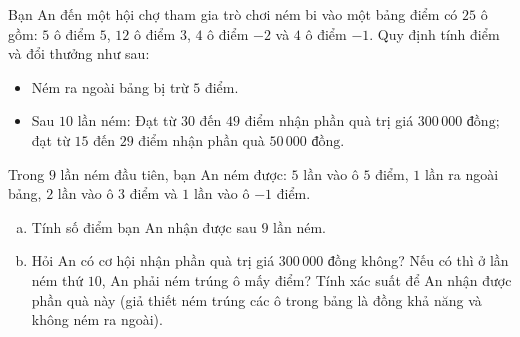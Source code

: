 \begin{bt}%
Bạn An đến một hội chợ tham gia trò chơi ném bi vào một bảng điểm có $25$ ô gồm: $5$ ô điểm $5$, $12$ ô điểm $3$, $4$ ô điểm $-2$ và $4$ ô điểm $-1$. Quy định tính điểm và đổi thưởng như sau:
\begin{itemize}
	\item Ném ra ngoài bảng bị trừ $5$ điểm.
	\item Sau $10$ lần ném: Đạt từ $30$ đến $49$ điểm nhận phần quà trị giá $300\,000\text{ đồng}$; đạt từ $15$ đến $29$ điểm nhận phần quà $50\,000\text{ đồng}$.
\end{itemize}
Trong $9$ lần ném đầu tiên, bạn An ném được: $5$ lần vào ô $5$ điểm, $1$ lần ra ngoài bảng, $2$ lần vào ô $3$ điểm và $1$ lần vào ô $-1$ điểm.
\begin{enumerate}[a)]
	\item Tính số điểm bạn An nhận được sau $9$ lần ném.
	\item Hỏi An có cơ hội nhận phần quà trị giá $300\,000\text{ đồng}$ không? Nếu có thì ở lần ném thứ $10$, An phải ném trúng ô mấy điểm? Tính xác suất để An nhận được phần quà này (giả thiết ném trúng các ô trong bảng là đồng khả năng và không ném ra ngoài).
\end{enumerate}
\end{bt}

